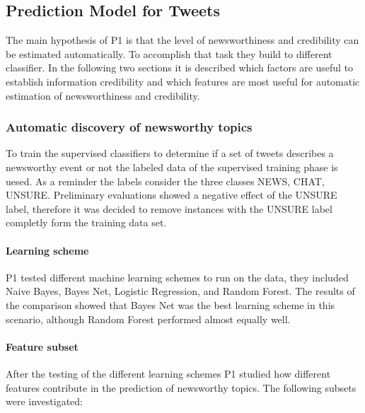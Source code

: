 \documentclass{proseminar}
\begin{document}
\subsection{Prediction Model for Tweets}
The main hypothesis of P1 is that the level of newsworthiness and credibility can be estimated automatically. To accomplish that task they build to different classifier. In the following two sections it is described which factors are useful to establish  information credibility and which features are most useful for automatic estimation of newsworthiness and credibility.


\subsubsection*{Automatic discovery of newsworthy topics}
To train the supervised classifiers to determine if a set of tweets describes a newsworthy event or not the labeled data of the supervised training phase is uesed. As a reminder the labels consider the three classes NEWS, CHAT, UNSURE. Preliminary evaluations showed a negative effect of the UNSURE label, therefore it was decided to remove instances with the UNSURE label completly form the training data set.

\paragraph{Learning scheme}
P1 tested different machine learning schemes to run on the data, they included Naive Bayes, Bayes Net, Logistic Regression, and Random Forest. The results of the comparison showed that Bayes Net was the best learning scheme in this scenario, although Random Forest performed almost equally well.

\paragraph{Feature subset}
After the testing of the different learning schemes P1 studied how different features  contribute in the prediction of newsworthy topics.
The following subsets were investigated:
\end{document}
